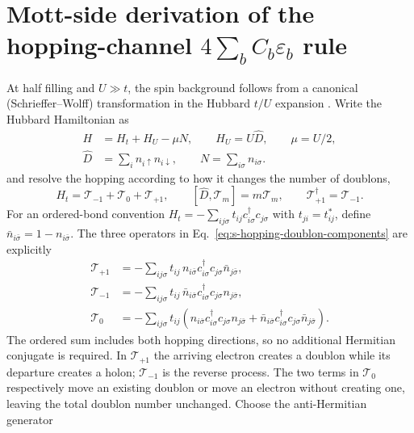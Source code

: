 \documentclass[10pt]{article}
\begin{document}
\section{Mott-side derivation of the hopping-channel $4\sum_b C_b\varepsilon_b$ rule}
\label{sec:s-spin-bond-rule}
At half filling and $U\gg t$, the spin background follows from a canonical
(Schrieffer--Wolff) transformation in the Hubbard $t/U$ expansion
\cite{macdonald1988tu,auerbach1994interacting}.  Write the Hubbard Hamiltonian as
\begin{equation}
\begin{aligned}
 H&=H_t+H_U-\mu N,\qquad H_U=U\hat D,
 \qquad \mu=U/2,\\
 \hat D&=\sum_i n_{i\uparrow}n_{i\downarrow},\qquad
 N=\sum_{i\sigma}n_{i\sigma}.
\end{aligned}
\label{eq:s-hubbard-doublon}
\end{equation}
and resolve the hopping according to how it changes the number of doublons,
\begin{equation}
 H_t=\mathcal T_{-1}+\mathcal T_0+\mathcal T_{+1},\qquad
 [\hat D,\mathcal T_m]=m\mathcal T_m,\qquad
 \mathcal T_{+1}^{\dagger}=\mathcal T_{-1}.
\label{eq:s-hopping-doublon-components}
\end{equation}
For an ordered-bond convention
$H_t=-\sum_{ij\sigma}t_{ij}c^\dagger_{i\sigma}c_{j\sigma}$ with
$t_{ji}=t_{ij}^*$, define
$\bar n_{i\bar\sigma}=1-n_{i\bar\sigma}$.  The three operators in
Eq.~\ref{eq:s-hopping-doublon-components} are explicitly
\begin{align}
 \mathcal T_{+1}
 &=-\sum_{ij\sigma}t_{ij}\,
 n_{i\bar\sigma}c^\dagger_{i\sigma}c_{j\sigma}
 \bar n_{j\bar\sigma},\nonumber\\
 \mathcal T_{-1}
 &=-\sum_{ij\sigma}t_{ij}\,
 \bar n_{i\bar\sigma}c^\dagger_{i\sigma}c_{j\sigma}
 n_{j\bar\sigma},\nonumber\\
 \mathcal T_0
 &=-\sum_{ij\sigma}t_{ij}\left(
 n_{i\bar\sigma}c^\dagger_{i\sigma}c_{j\sigma}n_{j\bar\sigma}
 +\bar n_{i\bar\sigma}c^\dagger_{i\sigma}c_{j\sigma}
 \bar n_{j\bar\sigma}\right).
\label{eq:s-explicit-doublon-components}
\end{align}
The ordered sum includes both hopping directions, so no additional Hermitian
conjugate is required.  In $\mathcal T_{+1}$ the arriving electron creates a
doublon while its departure creates a holon; $\mathcal T_{-1}$ is the reverse
process.  The two terms in $\mathcal T_0$ respectively move an existing
doublon or move an electron without creating one, leaving the total doublon
number unchanged.  Choose the anti-Hermitian generator
\end{document}
